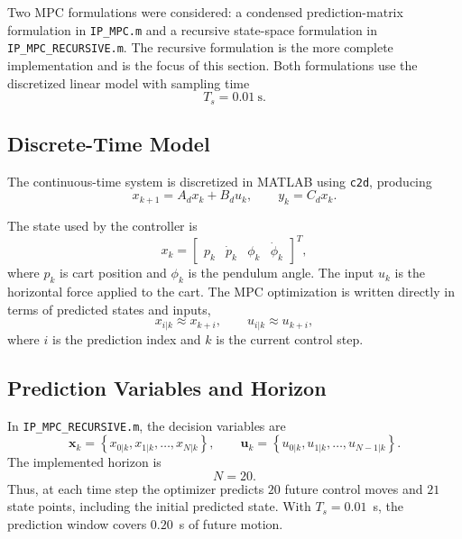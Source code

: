 \documentclass[conference]{IEEEtran}
\begin{document}
Two MPC formulations were considered: a condensed prediction-matrix formulation in \texttt{IP\_MPC.m} and a recursive state-space formulation in \texttt{IP\_MPC\_RECURSIVE.m}. The recursive formulation is the more complete implementation and is the focus of this section. Both formulations use the discretized linear model with sampling time
\[
T_s = 0.01~\text{s}.
\]

\subsection{Discrete-Time Model}
The continuous-time system is discretized in MATLAB using \texttt{c2d}, producing
\[
x_{k+1} = A_d x_k + B_d u_k, \qquad y_k = C_d x_k.
\]

The state used by the controller is
\[
x_k =
\begin{bmatrix}
p_k & \dot p_k & \phi_k & \dot \phi_k
\end{bmatrix}^{T},
\]
where $p_k$ is cart position and $\phi_k$ is the pendulum angle. The input $u_k$ is the horizontal force applied to the cart. The MPC optimization is written directly in terms of predicted states and inputs,
\[
x_{i|k} \approx x_{k+i}, \qquad u_{i|k} \approx u_{k+i},
\]
where $i$ is the prediction index and $k$ is the current control step.

\subsection{Prediction Variables and Horizon}
In \texttt{IP\_MPC\_RECURSIVE.m}, the decision variables are
\[
\mathbf{x}_k =
\left\{
x_{0|k},x_{1|k},\ldots,x_{N|k}
\right\},
\qquad
\mathbf{u}_k =
\left\{
u_{0|k},u_{1|k},\ldots,u_{N-1|k}
\right\}.
\]
The implemented horizon is
\[
N=20.
\]
Thus, at each time step the optimizer predicts $20$ future control moves and $21$ state points, including the initial predicted state. With $T_s=0.01$~s, the prediction window covers $0.20$~s of future motion.
\end{document}
